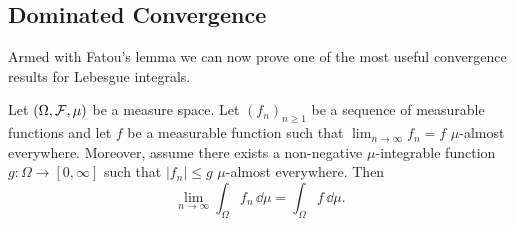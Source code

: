 \subsection{Dominated Convergence}

Armed with Fatou's lemma we can now prove one of the most useful convergence results for Lebesgue integrals.

\begin{theorem}\label{thm:dominated_convergence}
Let $(\Omega, \mathcal F, \mu)$ be a measure space. Let $(f_n)_{n \ge 1}$ be a sequence of measurable functions and let $f$ be a measurable function such that $\lim_{n\to\infty}f_n = f$ $\mu$-almost everywhere. Moreover, assume there exists a non-negative $\mu$-integrable function $g : \Omega \to [0,\infty]$ such that $|f_n| \le g$ $\mu$-almost everywhere. Then
\[
	\lim_{n \to \infty} \int_\Omega f_n \,\dd \mu = \int_\Omega f \,\dd \mu.
\]
\end{theorem}


